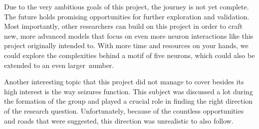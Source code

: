 \documentclass[class={myRUCProject}, crop=false]{standalone}
\begin{document}
Due to the very ambitious goals of this project, the journey is not yet complete. The future holds promising opportunities for further exploration and validation. Most importantly, other researchers can build on this project in order to craft new, more advanced models that focus on even more neuron interactions like this project originally intended to. With more time and resources on your hands, we could explore the complexities behind a motif of five neurons, which could also be extended to an even larger~number.

Another interesting topic that this project did not manage to cover besides its high interest is the way seizures function. This subject was discussed a lot during the formation of the group and played a crucial role in finding the right direction of the research question. Unfortunately, because of the countless opportunities and roads that were suggested, this direction was unrealistic to also follow. 
\end{document}
